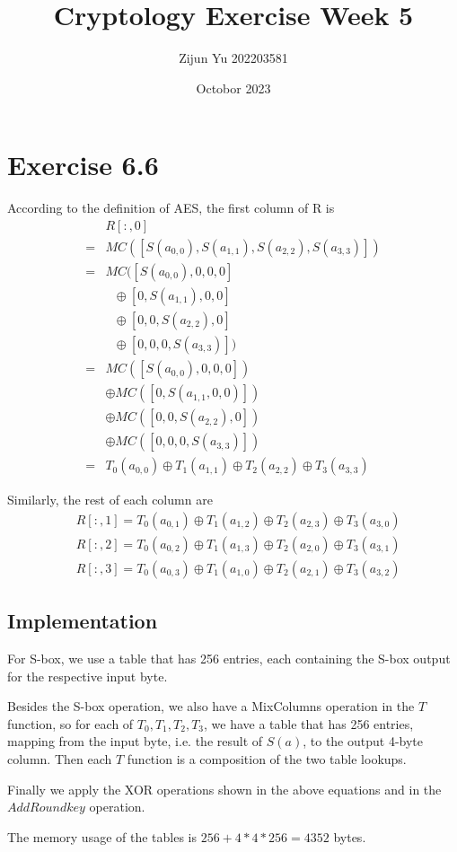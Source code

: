 \documentclass{article}
\title{Cryptology Exercise Week 5}
\author{Zijun Yu 202203581}
\date{Octobor 2023}
\begin{document}
\maketitle

\section*{Exercise 6.6}

According to the definition of AES, the first column of R
is
\begin{equation*}
    \begin{split}
        & R[:,0] \\
        = & MC([S(a_{0,0}), S(a_{1,1}), S(a_{2,2}), S(a_{3,3})]) \\
        = &  MC([S(a_{0,0}), 0, 0, 0] \\
        & \ \ \ \oplus [0, S(a_{1,1}), 0, 0] \\
        & \ \ \ \oplus [0, 0, S(a_{2,2}), 0] \\
        & \ \ \ \oplus [0, 0, 0, S(a_{3,3})]) \\
        = & MC([S(a_{0,0}), 0, 0, 0]) \\
        & \oplus MC([0, S(a_{1,1}, 0, 0)]) \\
        & \oplus MC([0, 0, S(a_{2,2}), 0]) \\
        & \oplus MC([0, 0, 0, S(a_{3,3})]) \\
        = & T_0(a_{0,0}) \oplus T_1(a_{1,1}) \oplus T_2(a_{2,2}) \oplus T_3(a_{3,3})
    \end{split}
\end{equation*}

Similarly, the rest of each column are
\begin{equation*}
    \begin{split}
        & R[:,1] = T_0(a_{0,1}) \oplus T_1(a_{1,2}) \oplus T_2(a_{2,3}) \oplus T_3(a_{3,0}) \\
        & R[:,2] = T_0(a_{0,2}) \oplus T_1(a_{1,3}) \oplus T_2(a_{2,0}) \oplus T_3(a_{3,1}) \\
        & R[:,3] =T_0(a_{0,3}) \oplus T_1(a_{1,0}) \oplus T_2(a_{2,1}) \oplus T_3(a_{3,2})
    \end{split}
\end{equation*}

\subsection*{Implementation}

For S-box, we use a table that has 256 entries, each containing
the S-box output for the respective input byte.

Besides the S-box operation, we also have a MixColumns operation in the $T$ function,
so for each of $T_0, T_1, T_2, T_3$, we have a table that has 256 entries,
mapping from the input byte, i.e. the result of $S(a)$, to the output 4-byte column.
Then each $T$ function is a composition of the two table lookups.

Finally we apply the XOR operations shown in the above equations and in the
$AddRoundkey$ operation.

The memory usage of the tables is $256 + 4 * 4 * 256 = 4352$ bytes.
\end{document}
